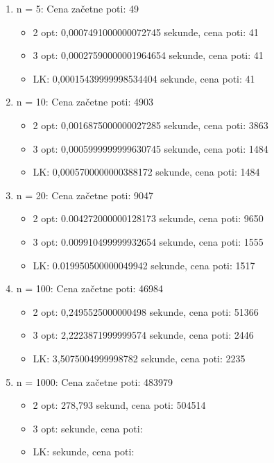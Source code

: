 \documentclass[12pt, a4paper]{article}
\begin{document}
\begin{enumerate}

\item n = 5:
Cena začetne poti: 49
\begin{itemize}

\item 2 opt: 0,0007491000000072745 sekunde, cena poti: 41
\item 3 opt: 0,00027590000001964654 sekunde, cena poti: 41
\item LK: 0,00015439999998534404 sekunde, cena poti: 41
\end{itemize}

\item n = 10:
Cena začetne poti: 4903
\begin{itemize} 

\item 2 opt: 0,0016875000000027285 sekunde, cena poti: 3863
\item 3 opt: 0,0005999999999630745 sekunde, cena poti: 1484
\item LK: 0,0005700000000388172 sekunde, cena poti: 1484
\end{itemize}

\item n = 20:
Cena začetne poti: 9047
\begin{itemize} 

\item 2 opt: 0.004272000000128173 sekunde, cena poti: 9650
\item 3 opt: 0.009910499999932654 sekunde, cena poti: 1555
\item LK: 0.019950500000049942 sekunde, cena poti: 1517
\end{itemize}

\item n = 100:
Cena začetne poti: 46984
\begin{itemize}

\item 2 opt: 0,2495525000000498 sekunde, cena poti: 51366
\item 3 opt:  2,2223871999999574 sekunde, cena poti: 2446
\item LK: 3,5075004999998782 sekunde, cena poti: 2235
\end{itemize}

\item n = 1000:
Cena začetne poti: 483979
\begin{itemize}

\item 2 opt: 278,793 sekund, cena poti: 504514
\item 3 opt:   sekunde, cena poti: 
\item LK:  sekunde, cena poti: 
\end{itemize}

\end{enumerate}
\end{document}
